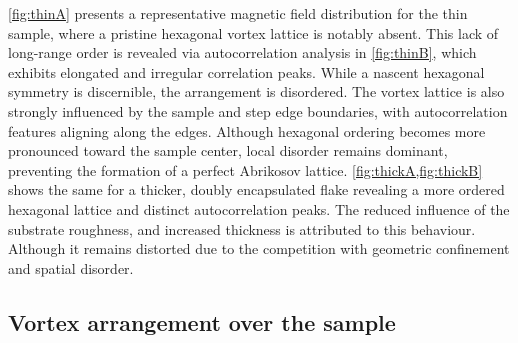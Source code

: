 \cref{fig:thinA} presents a representative magnetic field distribution for the thin sample, where a pristine hexagonal vortex lattice is notably absent. This lack of long-range order is revealed via autocorrelation analysis in \cref{fig:thinB}, which exhibits elongated and irregular correlation peaks. While a nascent hexagonal symmetry is discernible, the arrangement is disordered. The vortex lattice is also strongly influenced by the sample and step edge boundaries, with autocorrelation features aligning along the edges. Although hexagonal ordering becomes more pronounced toward the sample center, local disorder remains dominant, preventing the formation of a perfect Abrikosov lattice. \cref{fig:thickA,fig:thickB} shows the same for a thicker, doubly encapsulated flake revealing a more ordered hexagonal lattice and distinct autocorrelation peaks. The reduced influence of the substrate roughness, and increased thickness is attributed to this behaviour. Although it remains distorted due to the competition with geometric confinement and spatial disorder. 

\subsection{Vortex arrangement over the sample}

